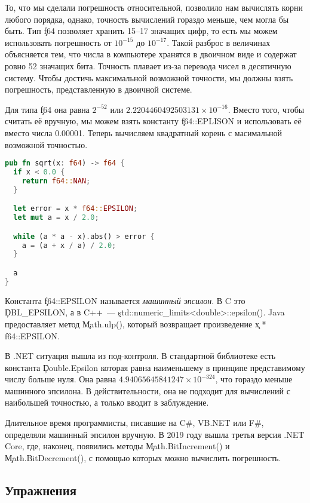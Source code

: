 То, что мы сделали погрешность относительной, позволило нам вычислять корни любого порядка, однако, точность вычислений гораздо меньше, чем могла бы быть.
Тип \c{f64} позволяет хранить 15–17 значащих цифр, то есть мы можем использовать погрешность от $10^{-15}$ до $10^{-17}$.
Такой разброс в величинах объясняется тем, что числа в компьютере хранятся в двоичном виде и содержат ровно 52 значащих бита.
Точность плавает из-за перевода чисел в десятичную систему.
Чтобы достичь максимальной возможной точности, мы должны взять погрешность, представленную в двоичной системе.

Для типа \c{f64} она равна $2^{-52}$ или $2.2204460492503131\times 10^{-16}$.
Вместо того, чтобы считать её вручную, мы можем взять константу \c{f64::EPLISON} и использовать её вместо числа 0.00001.
Теперь вычисляем квадратный корень с масимальной возможной точностью.

\begin{lstlisting}[language=Rust]
pub fn sqrt(x: f64) -> f64 {
  if x < 0.0 {
    return f64::NAN;
  }

  let error = x * f64::EPSILON;
  let mut a = x / 2.0;

  while (a * a - x).abs() > error {
    a = (a + x / a) / 2.0;
  }

  a
}
\end{lstlisting}

Константа \c{f64::EPSILON} называется {\em машинный эпсилон}.
В C это \c{DBL\_EPSILON}, а в C++~--- \c{std::numeric\_limits<double>::epsilon()}.
Java предоставляет метод \c{Math.ulp()}, который возвращает произведение \c{x * f64::EPSILON}.

В .NET ситуация вышла из под-контроля.
В стандартной библиотеке есть константа \c{Double.Epsilon} которая равна наименьшему в принципе представимому числу больше нуля.
Она равна $4.94065645841247\times 10^{-324}$, что гораздо меньше машинного эпсилона.
В действительности, она не подходит для вычислений с наибольшей точностью, а только вводит в заблуждение.

Длительное время программисты, писавшие на C\#, VB.NET или F\#, определяли машинный эпсилон вручную.
В 2019 году вышла третья версия .NET Core, где, наконец, появились методы \c{Math.BitIncrement()} и \c{Math.BitDecrement()}, с помощью которых можно вычислить погрешность.

\subsection{Упражнения}

